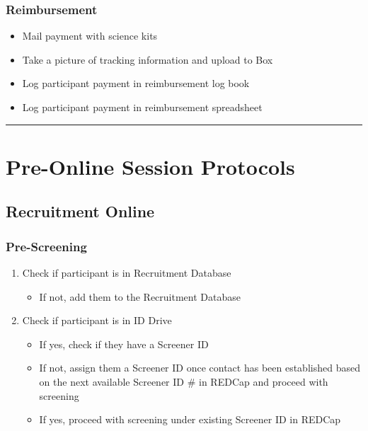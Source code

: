 \documentclass[]{book}
\providecommand{\tightlist}{%
  \setlength{\itemsep}{0pt}\setlength{\parskip}{0pt}}
\begin{document}
\hypertarget{reimbursement}{%
\subsubsection{Reimbursement}\label{reimbursement}}

\begin{itemize}
\tightlist
\item
  Mail payment with science kits
\item
  Take a picture of tracking information and upload to Box
\item
  Log participant payment in reimbursement log book
\item
  Log participant payment in reimbursement spreadsheet
\end{itemize}

\begin{center}\rule{0.5\linewidth}{0.5pt}\end{center}

\hypertarget{pre-online-session-protocols}{%
\section{Pre-Online Session Protocols}\label{pre-online-session-protocols}}

\hypertarget{recruitment-online}{%
\subsection{Recruitment Online}\label{recruitment-online}}

\hypertarget{pre-screening}{%
\subsubsection{Pre-Screening}\label{pre-screening}}

\begin{enumerate}
\def\labelenumi{\arabic{enumi}.}
\tightlist
\item
  Check if participant is in Recruitment Database

  \begin{itemize}
  \tightlist
  \item
    If not, add them to the Recruitment Database
  \end{itemize}
\item
  Check if participant is in ID Drive

  \begin{itemize}
  \tightlist
  \item
    If yes, check if they have a Screener ID
  \item
    If not, assign them a Screener ID once contact has been established based on the next available Screener ID \# in REDCap and proceed with screening
  \item
    If yes, proceed with screening under existing Screener ID in REDCap
  \end{itemize}
\end{enumerate}
\end{document}
